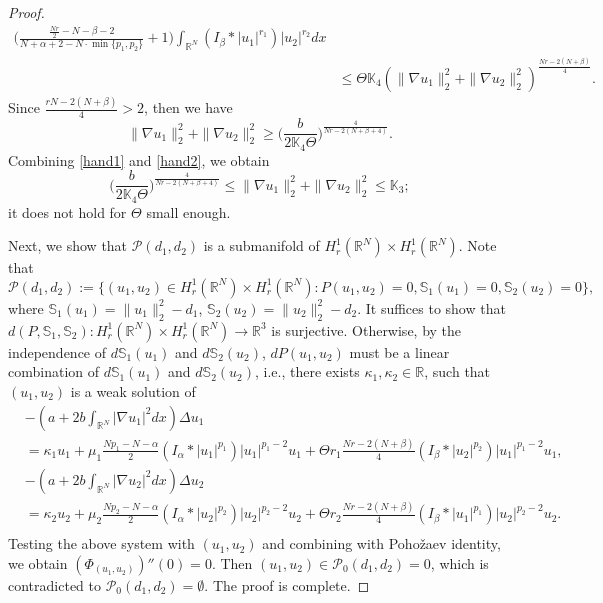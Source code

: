 \documentclass[reqno]{amsart}
\begin{document}
\begin{proof}
\begin{align*}
\Big(\frac{\frac{Nr}{2}-N-\beta-2}{N+\alpha+2-N\cdot\min\{p_1,p_2\}}+1\Big)
\int_{\mathbb{R}^N}(I_\beta\ast|u_1|^{r_1})|u_2|^{r_2}dx\\
&\leq \Theta\mathbb{K}_4(\| \nabla u_1\|_2^2+\| \nabla u_2\|_2^2)^{\frac{Nr-2(N+\beta)}{4}}.
\end{align*}
Since $\frac{rN-2(N+\beta)}{4}>2$, then we have
\begin{equation}\label{hand2}
 \| \nabla u_1\|_2^2+\| \nabla u_2\|_2^2
 \geq\Big(\frac{b}{2\mathbb{K}_4\Theta}\Big)^{\frac{4}{Nr-2(N+\beta+4)}}.
\end{equation}
Combining \eqref{hand1} and \eqref{hand2}, we obtain
\[
 \Big(\frac{b}{2\mathbb{K}_4\Theta}\Big)^{\frac{4}{Nr-2(N+\beta+4)}}
 \leq\| \nabla u_1\|_2^2+\| \nabla u_2\|_2^2
 \leq \mathbb{K}_3;
\]
it does not hold for $\Theta$ small enough.

Next, we show that $\mathcal{P}(d_1,d_2)$ is a submanifold of 
$H_r^1(\mathbb{R}^N)\times H_r^1(\mathbb{R}^N)$. Note that
\[
\mathcal{P}(d_1,d_2):=\{(u_1,u_2)\in H_r^1(\mathbb{R}^N)
\times H_r^1(\mathbb{R}^N):P(u_1,u_2)=0, \mathbb{S}_1(u_1)=0,\mathbb{S}_2(u_2)=0\},
\]
where $\mathbb{S}_1(u_1)=\| u_1\|_2^2-d_1$, $\mathbb{S}_2(u_2)=\| u_2\|_2^2-d_2$.
It suffices to show that
$d(P,\mathbb{S}_1,\mathbb{S}_2):H_r^1(\mathbb{R}^N)\times H_r^1(\mathbb{R}^N)
\to \mathbb{R}^3$ is surjective. Otherwise, by the
independence of $d\mathbb{S}_1(u_1)$ and $d\mathbb{S}_2(u_2)$, $dP(u_1,u_2)$ must
be a linear combination of $d\mathbb{S}_1(u_1)$ and $d\mathbb{S}_2(u_2)$,
i.e., there exists $\kappa_1,\kappa_2\in\mathbb{R}$, such that $(u_1,u_2)$
is a weak solution of
\begin{align*}
&-(a+2b\int_{\mathbb{R}^N}|\nabla u_1|^2dx)\Delta u_1 \\
&= \kappa_1 u_1+\mu_1\frac{Np_1-N-\alpha}{2}(I_\alpha\ast|u_1|^{p_1})|u_1|^{p_1-2}u_1
 +\Theta r_1\frac{Nr-2(N+\beta)}{4}(I_\beta\ast|u_2|^{p_2})|u_1|^{p_1-2}u_1,
\\
&-(a+2b\int_{\mathbb{R}^N}|\nabla u_2|^2dx)\Delta u_2 \\
&= \kappa_2 u_2+\mu_2\frac{Np_2-N-\alpha}{2}(I_\alpha\ast|u_2|^{p_2})|u_2|^{p_2-2}u_2
 +\Theta r_2\frac{Nr-2(N+\beta)}{4}(I_\beta\ast|u_1|^{p_1})|u_2|^{p_2-2}u_2. \\
\end{align*}
Testing the above system with $(u_1,u_2)$ and combining with Poho\v{z}aev identity,
we obtain $(\Phi_{(u_1,u_2)})''(0)=0$.
Then $(u_1,u_2)\in\mathcal{P}_0(d_1,d_2)=0$, which is contradicted to
$\mathcal{P}_0(d_1,d_2)=\emptyset$. The proof is complete.
\end{proof}
\end{document}
